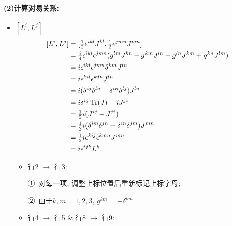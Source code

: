 \paragraph*{(2)计算对易关系: }
\begin{itemize}
  \item $[L^i, L^j]$
        \begin{equation}
          \begin{aligned}
            \relax[L^i, L^j] & = [\tfrac{1}{2}\epsilon^{ikl}J^{kl}, \tfrac{1}{2}\epsilon^{jmn}J^{mn}]                                \\
                             & = \tfrac{i}{4}\epsilon^{ikl}\epsilon^{jmn}(g^{lm}J^{kn} - g^{km}J^{ln} - g^{ln}J^{km} + g^{kn}J^{lm}) \\
                             & = i\epsilon^{ikl}\epsilon^{jmn}\delta^{km}J^{ln}                                                      \\
                             & = i\epsilon^{kil}\epsilon^{kjn}J^{ln}                                                                 \\
                             & = i(\delta^{ij}\delta^{ln}-\delta^{in}\delta^{lj})J^{ln}                                              \\
                             & = i\delta^{ij}\operatorname{Tr}(J) - iJ^{ji}                                                                        \\
                             & = \tfrac{1}{2}i(J^{ij} - J^{ji})                                                                      \\
                             & = \tfrac{1}{2}i(\delta^{im}\delta^{jn}-\delta^{in}\delta^{jm})J^{mn}                                  \\
                             & = \tfrac{1}{2}i\epsilon^{kij}\epsilon^{kmn}J^{mn}                                                     \\
                             & = i\epsilon^{ijk}L^k.
          \end{aligned}
        \end{equation}
        \begin{itemize}
          \item 行2 $\rightarrow$ 行3:

                \quad ①\ 对每一项, 调整上标位置后重新标记上标字母;

                \quad ②\ 由于$k, m = 1, 2, 3$, $g^{km} = -\delta^{km}$.
          \item 行4 $\rightarrow$ 行5 \& 行8 $\rightarrow$ 行9:


\end{itemize}
\end{itemize}
